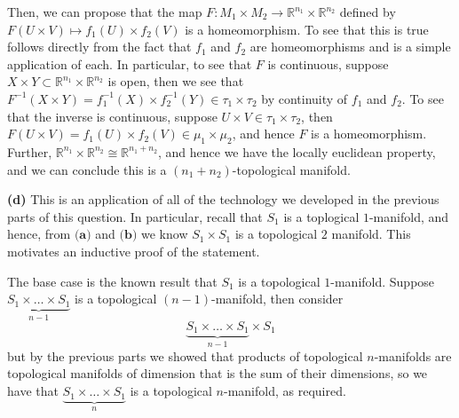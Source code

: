 \documentclass[10pt]{article}
\newcommand{\R}{\mathbb{R}}
\begin{document}
Then, we can propose that the map $F: M_{1}\times M_{2} \to \R^{n_{1}}\times \R^{n_{2}}$ defined by $F(U\times V) \mapsto f_{1}(U)\times f_{2}(V)$ is a homeomorphism. To see that this is true follows directly from the fact that $f_{1}$ and $f_{2}$ are homeomorphisms and is a simple application of each. In particular, to see that $F$ is continuous, suppose $X\times Y \subset \R^{n_{1}}\times \R^{n_{2}}$ is open, then we see that $F^{-1}(X\times Y) = f_{1}^{-1}(X) \times f_{2}^{-1}(Y) \in \tau_{1}\times \tau_{2}$ by continuity of $f_{1}$ and $f_{2}$. To see that the inverse is continuous, suppose $U\times V \in \tau_{1}\times \tau_{2}$, then $F(U\times V) = f_{1}(U)\times f_{2}(V) \in \mu_{1}\times \mu_{2}$, and hence $F$ is a homeomorphism. Further, $\R^{n_{1}}\times \R^{n_{2}} \cong \R^{n_{1}+n_{2}}$, and hence we have the locally euclidean property, and we can conclude this is a $(n_{1}+n_{2})$-topological manifold.

\textbf{(d)} This is an application of all of the technology we developed in the previous parts of this question. In particular, recall that $S_{1}$ is a toplogical $1$-manifold, and hence, from $\textbf{(a)}$ and $\textbf{(b)}$ we know $S_{1} \times S_{1}$ is a topological $2$ manifold. This motivates an inductive proof of the statement.

The base case is the known result that $S_{1}$ is a topological $1$-manifold. Suppose $\underbrace{S_{1}\times \dots \times S_{1}}_{n-1}$ is a topological $(n-1)$-manifold, then consider
$$\underbrace{S_{1}\times \dots \times S_{1}}_{n-1}\times S_{1}$$
but by the previous parts we showed that products of topological $n$-manifolds are topological manifolds of dimension that is the sum of their dimensions, so we have that $\underbrace{S_{1}\times \dots \times S_{1}}_{n}$ is a topological $n$-manifold, as required.
\end{document}
